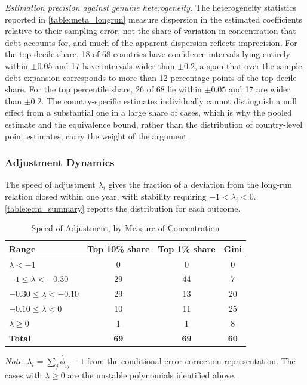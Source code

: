 \documentclass[12pt, titlepage]{article}
\numberwithin{equation}{section}
\begin{document}
\textit{Estimation precision against genuine heterogeneity.} The heterogeneity
statistics reported in \autoref{table:meta_longrun} measure dispersion in the
estimated coefficients relative to their sampling error, not the share of
variation in concentration that debt accounts for, and much of the apparent
dispersion reflects imprecision. For the top decile share, 18 of 68 countries
have confidence intervals lying entirely within $\pm 0.05$ and 17 have
intervals wider than $\pm 0.2$, a span that over the sample debt expansion
corresponds to more than 12 percentage points of the top decile share. For the
top percentile share, 26 of 68 lie within $\pm 0.05$ and 17 are wider than
$\pm 0.2$. The country-specific estimates individually cannot distinguish a
null effect from a substantial one in a large share of cases, which is why the
pooled estimate and the equivalence bound, rather than the distribution of
country-level point estimates, carry the weight of the argument.

\subsubsection{Adjustment Dynamics}

The speed of adjustment $\lambda_{i}$ gives the fraction of a deviation from
the long-run relation closed within one year, with stability requiring
$-1 < \lambda_{i} < 0$. \autoref{table:ecm_summary} reports the distribution
for each outcome.

\begin{table}[htbp]
	\centering
	\begin{threeparttable}
		\caption{Speed of Adjustment, by Measure of Concentration}
		\label{table:ecm_summary}
		\begin{small}
			\begin{tabular}{lccc}
				\toprule
				\textbf{Range} & \textbf{Top 10\% share} & \textbf{Top 1\% share} & \textbf{Gini} \\
				\midrule
				$\lambda < -1$               & 0  & 0  & 0  \\
				$-1 \leq \lambda < -0.30$    & 29 & 44 & 7  \\
				$-0.30 \leq \lambda < -0.10$ & 29 & 13 & 20 \\
				$-0.10 \leq \lambda < 0$     & 10 & 11 & 25 \\
				$\lambda \geq 0$             & 1  & 1  & 8  \\
				\midrule
				\textbf{Total}               & \textbf{69} & \textbf{69} & \textbf{60} \\
				\bottomrule
			\end{tabular}
		\end{small}
		\begin{tablenotes}
			\footnotesize
			\item \emph{Note}: $\lambda_{i} = \sum_{j}\hat\phi_{ij} - 1$ from the
			conditional error correction representation. The cases with
			$\lambda \geq 0$ are the unstable polynomials identified above.
		\end{tablenotes}
	\end{threeparttable}
\end{table}
\end{document}
